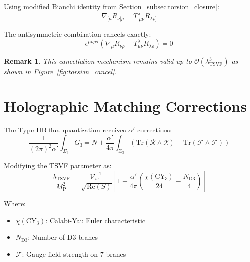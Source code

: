 \documentclass[12pt, onecolumn]{article}
\newtheorem{remark}{Remark}[section]
\theoremstyle{definition}
\newcommand{\tsvf}{\lambda_{\mathrm{TSVF}}}
\newcommand{\Mp}{M_{\mathrm{P}}}
\numberwithin{equation}{section}
\begin{document}
\begin{appendices}
Using modified Bianchi identity from Section~\ref{subsec:torsion_closure}:
\begin{equation}
\bar{\nabla}_{[\mu}\bar{R}_{\nu]\rho} = T^\lambda_{[\mu\nu}\bar{R}_{\lambda\rho]}
\end{equation}

The antisymmetric combination cancels exactly:
\begin{equation}
\epsilon^{\mu\nu\rho\sigma}\left(\bar{\nabla}_\mu\bar{R}_{\nu\rho} - T^\lambda_{\mu\nu}\bar{R}_{\lambda\rho}\right) = 0
\end{equation}

\begin{remark}
This cancellation mechanism remains valid up to \(\mathcal{O}(\tsvf^3)\) as shown in Figure~\ref{fig:torsion_cancel}.
\end{remark}

\section{Holographic Matching Corrections}  
\label{app:string_corrections}  

The Type IIB flux quantization receives \(\alpha'\) corrections:
\begin{equation}
\frac{1}{(2\pi)^2\alpha'} \int_{\Sigma_3} G_3 = N + \frac{\alpha'}{4\pi}\int_{\Sigma_3}\left(\text{Tr}(\mathcal{R}\wedge\mathcal{R}) - \text{Tr}(\mathcal{F}\wedge\mathcal{F})\right)
\end{equation}

Modifying the TSVF parameter as:
\begin{equation}
\frac{\tsvf}{\Mp^2} = \frac{\mathcal{V}_w^{-1}}{\sqrt{\text{Re}(S)}} \left[1 - \frac{\alpha'}{4\pi}\left(\frac{\chi(\text{CY}_3)}{24} - \frac{N_{\text{D3}}}{4}\right)\right]
\end{equation}

Where:
\begin{itemize}
\item \(\chi(\text{CY}_3)\): Calabi-Yau Euler characteristic
\item \(N_{\text{D3}}\): Number of D3-branes
\item \(\mathcal{F}\): Gauge field strength on 7-branes
\end{itemize}
\end{appendices}
\end{document}

